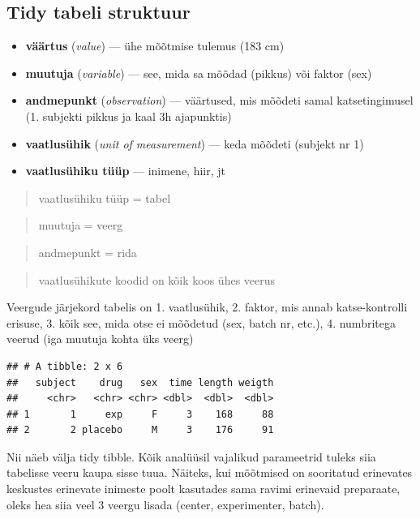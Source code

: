 \documentclass[]{book}
\providecommand{\tightlist}{%
  \setlength{\itemsep}{0pt}\setlength{\parskip}{0pt}}
\begin{document}
\subsection{Tidy tabeli struktuur}\label{tidy-tabeli-struktuur}

\begin{itemize}
\tightlist
\item
  \textbf{väärtus} (\emph{value}) --- ühe mõõtmise tulemus (183 cm)
\item
  \textbf{muutuja} (\emph{variable}) --- see, mida sa mõõdad (pikkus)
  või faktor (sex)
\item
  \textbf{andmepunkt} (\emph{observation}) --- väärtused, mis mõõdeti
  samal katsetingimusel (1. subjekti pikkus ja kaal 3h ajapunktis)
\item
  \textbf{vaatlusühik} (\emph{unit of measurement}) --- keda mõõdeti
  (subjekt nr 1)
\item
  \textbf{vaatlusühiku tüüp} --- inimene, hiir, jt
\end{itemize}

\begin{quote}
vaatlusühiku tüüp = tabel
\end{quote}

\begin{quote}
muutuja = veerg
\end{quote}

\begin{quote}
andmepunkt = rida
\end{quote}

\begin{quote}
vaatlusühikute koodid on kõik koos ühes veerus
\end{quote}

Veergude järjekord tabelis on 1. vaatlusühik, 2. faktor, mis annab
katse-kontrolli erisuse, 3. kõik see, mida otse ei mõõdetud (sex, batch
nr, etc.), 4. numbritega veerud (iga muutuja kohta üks veerg)

\begin{verbatim}
## # A tibble: 2 x 6
##   subject    drug   sex  time length weigth
##     <chr>   <chr> <chr> <dbl>  <dbl>  <dbl>
## 1       1     exp     F     3    168     88
## 2       2 placebo     M     3    176     91
\end{verbatim}

Nii näeb välja tidy tibble. Kõik analüüsil vajalikud parameetrid tuleks
siia tabelisse veeru kaupa sisse tuua. Näiteks, kui mõõtmised on
sooritatud erinevates keskustes erinevate inimeste poolt kasutades sama
ravimi erinevaid preparaate, oleks hea siia veel 3 veergu lisada
(center, experimenter, batch).
\end{document}
